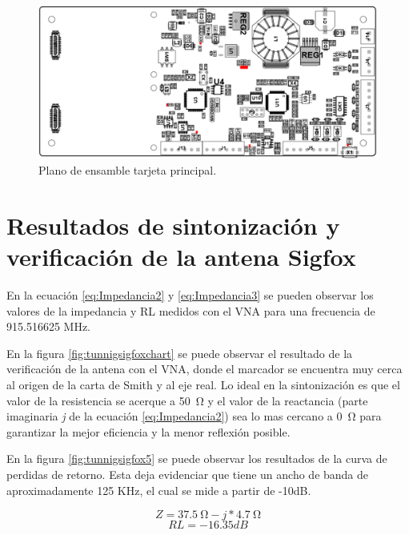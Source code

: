 \begin{figure}[H]
	\centering
	\includegraphics[scale=.45]{./Figures/Planoensamble.PNG}
	\caption{Plano de ensamble tarjeta principal.}
	\label{fig:Planoensamble}
\end{figure}

\section{Resultados de sintonización y verificación de la antena Sigfox}
En la ecuación \ref{eq:Impedancia2} y \ref{eq:Impedancia3} se pueden observar los valores de la impedancia y RL medidos con el VNA para una frecuencia de 915.516625 MHz.

En la figura \ref{fig:tunnigsigfoxchart} se puede observar el resultado de la verificación de la antena con el VNA, donde el marcador se encuentra muy cerca al origen de la carta de Smith y al eje real. Lo ideal en la sintonización es que el valor de la resistencia se acerque a \SI{50}{\ohm} y el valor de la reactancia (parte imaginaria \textit{j} de la ecuación \ref{eq:Impedancia2}) sea lo mas cercano a \SI{0}{\ohm} para garantizar la mejor eficiencia y la menor reflexión posible.

En la figura \ref{fig:tunnigsigfox5} se puede observar los resultados de la curva de perdidas de retorno. Esta deja evidenciar que tiene un ancho de banda de aproximadamente 125 KHz, el cual se mide a partir de -10dB\citep{AntenaSigFox2016}.


\begin{equation}
	\label{eq:Impedancia2}
	Z = 37.5\SI{}{\ohm} - j*4.7\SI{}{\ohm}
\end{equation}
\begin{equation}
	\label{eq:Impedancia3}
    RL = -16.35 dB
\end{equation}

